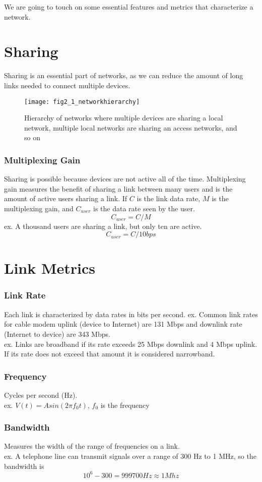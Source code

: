 
We are going to touch on some essential features and metrics that characterize a network.

\section{Sharing}
Sharing is an essential part of networks, as we can reduce the amount of long links needed to connect multiple devices. 
\begin{figure}[!htbp]
    \centering
    \texttt{[image: fig2\_1\_networkhierarchy]}
    \caption{Hierarchy of networks where multiple devices are sharing a local network, multiple local networks are sharing an access networks, and so on}
    \label{fig:Network_Hierarchy}
\end{figure}
\subsubsection*{Multiplexing Gain}
Sharing is possible because devices are not active all of the time. Multiplexing gain measures the benefit of sharing a link between many users and is the amount of active users sharing a link. If $C$ is the link data rate, $M$ is the multiplexing gain, and $C_{user}$ is the data rate seen by the user.
$$ C_{user} = C/M $$
ex. A thousand users are sharing a link, but only ten are active.
$$ C_{user} = C/10 bps$$

\section{Link Metrics}
\subsubsection*{Link Rate}
Each link is characterized by data rates in bits per second.
ex. Common link rates for cable modem uplink (device to Internet) are 131 Mbps and downlink rate (Internet to device) are 343 Mbps. \\
ex. Links are broadband if its rate exceeds 25 Mbps
downlink and 4 Mbps uplink. If its rate does not exceed that amount it is considered narrowband.
\subsubsection*{Frequency}
Cycles per second (Hz). \\
ex. $V(t) = A sin(2 \pi f_0 t)$, $f_0$ is the frequency
\subsubsection*{Bandwidth}
Measures the width of the range of frequencies on a link.\\
ex. A telephone line can transmit signals over a range of 300 Hz to 1 MHz, so the bandwidth is $$10^6 - 300 = 999700 Hz \approx 1 Mhz$$
